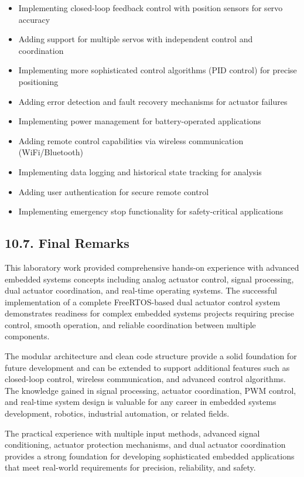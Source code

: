 \documentclass[12pt]{article}
\begin{document}
\begin{itemize}
    \item Implementing closed-loop feedback control with position sensors for servo accuracy
    \item Adding support for multiple servos with independent control and coordination
    \item Implementing more sophisticated control algorithms (PID control) for precise positioning
    \item Adding error detection and fault recovery mechanisms for actuator failures
    \item Implementing power management for battery-operated applications
    \item Adding remote control capabilities via wireless communication (WiFi/Bluetooth)
    \item Implementing data logging and historical state tracking for analysis
    \item Adding user authentication for secure remote control
    \item Implementing emergency stop functionality for safety-critical applications
\end{itemize}

\subsection*{10.7. Final Remarks}

This laboratory work provided comprehensive hands-on experience with advanced embedded systems concepts including analog actuator control, signal processing, dual actuator coordination, and real-time operating systems. The successful implementation of a complete FreeRTOS-based dual actuator control system demonstrates readiness for complex embedded systems projects requiring precise control, smooth operation, and reliable coordination between multiple components.

The modular architecture and clean code structure provide a solid foundation for future development and can be extended to support additional features such as closed-loop control, wireless communication, and advanced control algorithms. The knowledge gained in signal processing, actuator coordination, PWM control, and real-time system design is valuable for any career in embedded systems development, robotics, industrial automation, or related fields.

The practical experience with multiple input methods, advanced signal conditioning, actuator protection mechanisms, and dual actuator coordination provides a strong foundation for developing sophisticated embedded applications that meet real-world requirements for precision, reliability, and safety.
\end{document}

